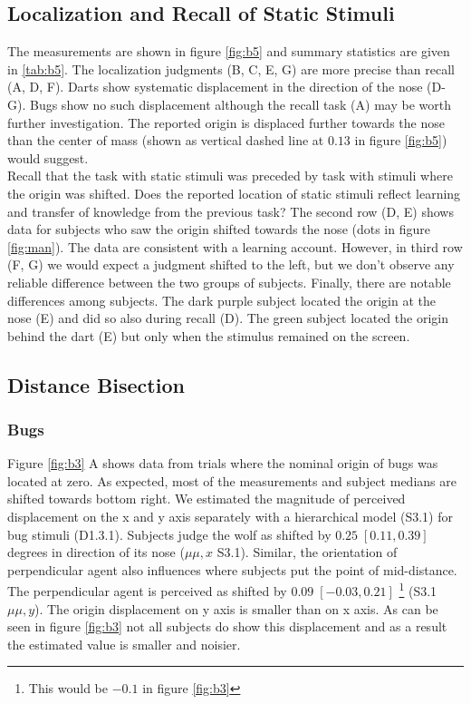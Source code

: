 \documentclass[10pt]{article}
\begin{document}
\subsection*{Localization and Recall of Static Stimuli}

The measurements are shown in figure \ref{fig:b5} and summary statistics are given in \ref{tab:b5}. 
The localization judgments (B, C, E, G) are more precise than recall (A, D, F). 
Darts show systematic displacement in the direction of the nose (D-G). 
Bugs show no such displacement although the recall task (A) may be worth further investigation. 
The reported origin is displaced further towards the nose than the center of mass (shown as vertical dashed line at $0.13$ in figure \ref{fig:b5}) would suggest. \\
Recall that the task with static stimuli was preceded by task with stimuli where the origin was shifted. 
Does the reported location of static stimuli reflect learning and transfer of knowledge from the previous task? 
The second row (D, E) shows data for subjects who saw the origin shifted towards the nose (dots in figure \ref{fig:man}). 
The data are consistent with a learning account. 
However, in third row (F, G) we would expect a judgment shifted to the left, but we don't observe any reliable difference between the two groups of subjects. 
Finally, there are notable differences among subjects. 
The dark purple subject located the origin at the nose (E) and did so also during recall (D). 
The green subject located the origin behind the dart (E) but only when the stimulus remained on the screen. 

\subsection*{Distance Bisection}
\subsubsection*{Bugs}
Figure \ref{fig:b3} A shows data from trials where the nominal origin of bugs was located at zero. 
As expected, most of the measurements and subject medians are shifted towards bottom right.
We estimated the magnitude of perceived displacement on the x and y axis separately with a hierarchical model (S3.1) for bug stimuli (D1.3.1). Subjects judge the wolf as shifted by $0.25 \; [0.11,0.39]$ degrees in direction of its nose ($\mu{\mu,x}$ S3.1). %
Similar, the orientation of perpendicular agent also influences where subjects put the point of mid-distance. 
The perpendicular agent is perceived as shifted by $0.09\; [-0.03,0.21]$ \footnote{This would be $-0.1$ in figure \ref{fig:b3}} (S3.1 $\mu{\mu,y}$). 
The origin displacement on y axis is smaller than on x axis. 
As can be seen in figure \ref{fig:b3} not all subjects do show this displacement and as a result the estimated value is smaller and noisier.\\
\end{document}
